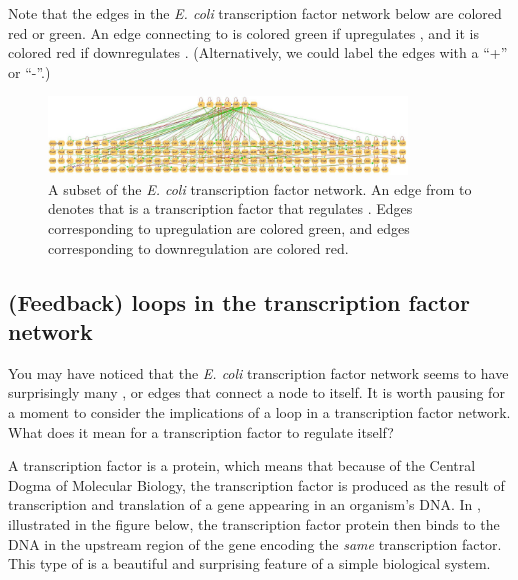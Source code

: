 Note that the edges in the \textit{E. coli} transcription factor network below are colored red or green. An edge connecting  to  is colored green if  upregulates , and it is colored red if  downregulates . (Alternatively, we could label the edges with a ``+'' or ``-''.)

\begin{figure}[h]
\centering
\mySfFamily
\includegraphics[width = 0.85\textwidth]{../images/e_coli_tf_network.jpeg}
\caption{A subset of the \textit{E. coli} transcription factor network. An edge from  to  denotes that  is a transcription factor that regulates . Edges corresponding to upregulation are colored green, and edges corresponding to downregulation are colored red.}
\label{fig:e_coli_tf_network}
\end{figure}

\begin{qbox}\end{qbox} 

\FloatBarrier
{}
\subsection{(Feedback) loops in the transcription factor network}

You may have noticed that the \textit{E. coli} transcription factor network seems to have surprisingly many , or edges that connect a node to itself. It is worth pausing for a moment to consider the implications of a loop in a transcription factor network. What does it mean for a transcription factor to regulate itself?

A transcription factor is a protein, which means that because of the Central Dogma of Molecular Biology, the transcription factor is produced as the result of transcription and translation of a gene appearing in an organism's DNA. In , illustrated in the figure below, the transcription factor protein then binds to the DNA in the upstream region of the gene encoding the \textit{same} transcription factor. This type of  is a beautiful and surprising feature of a simple biological system.\\

